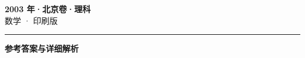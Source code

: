 \documentclass[zihao=5, a4paper]{ctexart}
\begin{document}
\begin{center}
  {\Large\bfseries 2003 年·北京卷·理科}\\[4pt]
  {\large 数学 · 印刷版}
\end{center}
\medskip
{}

\par\bigskip\hrule\bigskip
{}
\begin{center}{\large\bfseries 参考答案与详细解析}\end{center}
\smallskip

\end{document}
